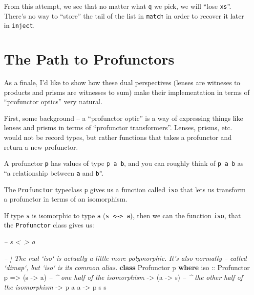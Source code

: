 \documentclass[]{article}
\newenvironment{Shaded}{}{}
\newcommand{\CommentTok}[1]{\textcolor[rgb]{0.38,0.63,0.69}{\textit{#1}}}
\newcommand{\DataTypeTok}[1]{\textcolor[rgb]{0.56,0.13,0.00}{#1}}
\newcommand{\KeywordTok}[1]{\textcolor[rgb]{0.00,0.44,0.13}{\textbf{#1}}}
\newcommand{\NormalTok}[1]{#1}
\newcommand{\OtherTok}[1]{\textcolor[rgb]{0.00,0.44,0.13}{#1}}
\begin{document}
From this attempt, we see that no matter what \texttt{q} we pick, we will ``lose
\texttt{xs}''. There's no way to ``store'' the tail of the list in
\texttt{match} in order to recover it later in \texttt{inject}.

\hypertarget{the-path-to-profunctors}{%
\section{The Path to Profunctors}\label{the-path-to-profunctors}}

As a finale, I'd like to show how these dual perspectives (lenses are witneses
to products and prisms are witnesses to sum) make their implementation in terms
of ``profunctor optics'' very natural.

First, some background -- a ``profunctor optic'' is a way of expressing things
like lenses and prisms in terms of ``profunctor transformers''. Lenses, prisms,
etc. would not be record types, but rather functions that takes a profunctor and
return a new profunctor.

A profunctor \texttt{p} has values of type \texttt{p\ a\ b}, and you can roughly
think of \texttt{p\ a\ b} as ``a relationship between \texttt{a} and
\texttt{b}''.

The \texttt{Profunctor} typeclass \texttt{p} gives us a function called
\texttt{iso} that lets us transform a profunctor in terms of an isomorphism.

If type \texttt{s} is isomorphic to type \texttt{a}
(\texttt{s\ \textless{}\textasciitilde{}\textgreater{}\ a}), then we can the
function \texttt{iso}, that the \texttt{Profunctor} class gives us:

\begin{Shaded}
\begin{Highlighting}[]
\CommentTok{-- s <~> a}

\CommentTok{-- | The real `iso` is actually a little more polymorphic.  It's also normally}
\CommentTok{-- called `dimap`, but `iso` is its common alias.}
\KeywordTok{class} \DataTypeTok{Profunctor}\NormalTok{ p }\KeywordTok{where}
\OtherTok{    iso ::} \DataTypeTok{Profunctor}\NormalTok{ p}
        \OtherTok{=>}\NormalTok{ (s }\OtherTok{->}\NormalTok{ a)         }\CommentTok{-- ^ one half of the isomorphism}
        \OtherTok{->}\NormalTok{ (a }\OtherTok{->}\NormalTok{ s)         }\CommentTok{-- ^ the other half of the isomorphism}
        \OtherTok{->}\NormalTok{ p a a}
        \OtherTok{->}\NormalTok{ p s s}
\end{Highlighting}
\end{Shaded}
\end{document}
